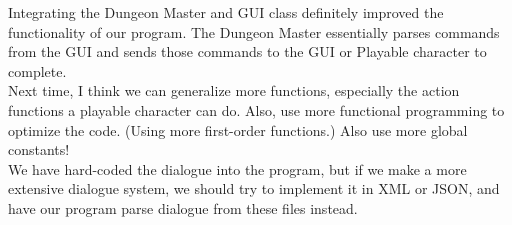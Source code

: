 \documentclass{article}
\theoremstyle{definition}
\begin{document}
Integrating the Dungeon Master and GUI class definitely improved the 
functionality of our program. The Dungeon Master essentially parses commands from
the GUI and sends those commands to the GUI or Playable character to complete.\\

Next time, I think we can generalize more functions, especially the action
functions a playable character can do. Also, use more functional programming to
optimize the code. (Using more first-order functions.) Also use more global
constants! \\

We have hard-coded the dialogue into the program, but if we make a more extensive
dialogue system, we should try to implement it in XML or JSON, and have our
program parse dialogue from these files instead. \\
\end{document}
